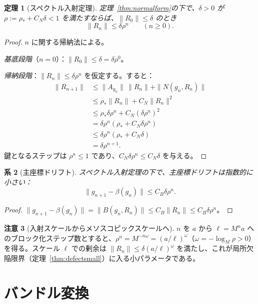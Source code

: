 \documentclass[12pt]{article}
\theoremstyle{plain}
\newtheorem{theorem}{定理}[section]
\newtheorem{corollary}[theorem]{系}
\theoremstyle{definition}
\newtheorem{remark}[theorem]{注意}
\numberwithin{equation}{section}
\begin{document}
\begin{theorem}[スペクトル入射定理]\label{thm:spectralentry}
定理~\ref{thm:normalform}の下で、$\delta>0$ が $\rho:=\rho_*+C_N\delta<1$ を満たすならば、$\|R_0\|\leq\delta$ のとき
\begin{equation}
\boxed{\|R_n\| \leq \delta\rho^n \qquad(n\geq 0).}
\end{equation}
\end{theorem}

\begin{proof}
$n$ に関する帰納法による。

\emph{基底段階}（$n=0$）：$\|R_0\|\leq\delta=\delta\rho^0$。

\emph{帰納段階}：$\|R_n\|\leq\delta\rho^n$ を仮定する。すると：
\begin{align}
\|R_{n+1}\| &\leq \|A_{g_n}\|\,\|R_n\| + \|N(g_n,R_n)\|\\
&\leq \rho_*\|R_n\| + C_N\|R_n\|^2\\
&\leq \rho_*\delta\rho^n + C_N(\delta\rho^n)^2\\
&= \delta\rho^n(\rho_*+C_N\delta\rho^n)\\
&\leq \delta\rho^n(\rho_*+C_N\delta)\\
&= \delta\rho^{n+1}.
\end{align}
鍵となるステップは $\rho^n\leq 1$ であり、$C_N\delta\rho^n\leq C_N\delta$ を与える。
\end{proof}

\begin{corollary}[主座標ドリフト]\label{cor:drift}
スペクトル入射定理の下で、主座標ドリフトは指数的に小さい：
\begin{equation}
\|g_{n+1}-\beta(g_n)\| \leq C_B\delta\rho^n.
\end{equation}
\end{corollary}

\begin{proof}
$\|g_{n+1}-\beta(g_n)\|=\|B(g_n,R_n)\|\leq C_B\|R_n\|\leq C_B\delta\rho^n$。
\end{proof}

\begin{remark}[入射スケールからメソスコピックスケールへ]
$n$ を $a$ から $\ell=M^n a$ へのブロック化ステップ数とすると、$\rho^n=M^{-n\omega}=(a/\ell)^\omega$（$\omega=-\log_M\rho>0$）を得る。スケール $\ell$ での剰余は $\|R_n\|\leq\delta(a/\ell)^\omega$ を満たし、これが局所欠陥限界（定理~\ref{thm:defectsmall}）に入る小パラメータである。
\end{remark}

\section{バンドル変換}\label{sec:transduction}
\end{document}
